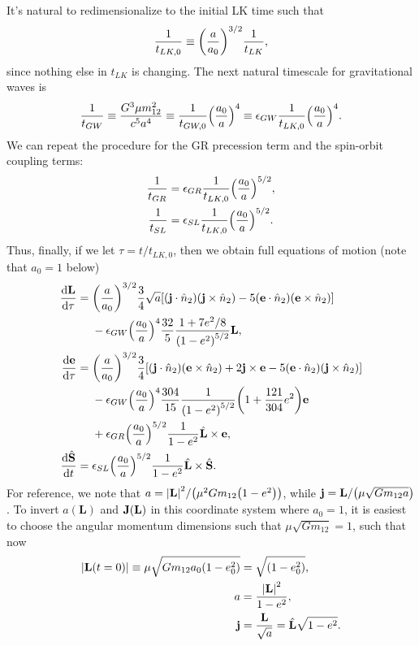 \documentclass[11pt,
        usenames, %
        dvipsnames %
    ]{article}
\newcommand*{\rd}[2]{\frac{\mathrm{d}#1}{\mathrm{d}#2}}
\newcommand*{\bm}[1]{\boldsymbol{\mathbf{#1}}}
\DeclarePairedDelimiter\abs{\lvert}{\rvert}
\DeclarePairedDelimiter\p{\lparen}{\rparen}
\DeclarePairedDelimiter\s{\lbrack}{\rbrack}
\begin{document}
It's natural to redimensionalize to the initial LK time such that
\begin{equation}
    \frac{1}{t_{LK, 0}} \equiv \p*{\frac{a}{a_0}}^{3/2}\frac{1}{t_{LK}},
\end{equation}
since nothing else in $t_{LK}$ is changing. The next natural timescale for
gravitational waves is
\begin{equation}
    \frac{1}{t_{GW}} \equiv \frac{G^3 \mu m_{12}^2}{c^5a^4}
        \equiv \frac{1}{t_{GW, 0}} \p*{\frac{a_0}{a}}^4
        \equiv \epsilon_{GW} \frac{1}{t_{LK, 0}} \p*{\frac{a_0}{a}}^4.
\end{equation}
We can repeat the procedure for the GR precession term and the spin-orbit
coupling terms:
\begin{align}
    \frac{1}{t_{GR}} &= \epsilon_{GR}\frac{1}{t_{LK, 0}}
        \p*{\frac{a_0}{a}}^{5/2},\\
    \frac{1}{t_{SL}} &= \epsilon_{SL}\frac{1}{t_{LK, 0}}
        \p*{\frac{a_0}{a}}^{5/2}.
\end{align}
Thus, finally, if we let $\tau = t / t_{LK, 0}$, then we obtain full equations
of motion (note that $a_0 = 1$ below)
\begin{align}
    \rd{\bm{L}}{\tau} ={}& \p*{\frac{a}{a_0}}^{3/2} \frac{3}{4}\sqrt{a}\s*{
            \p*{\bm{j} \cdot \hat{n}_2} \p*{\bm{j} \times \hat{n}_2}
            - 5\p*{\bm{e} \cdot \hat{n}_2}\p*{\bm{e} \times \hat{n}_2}
            }\nonumber\\
        &- \epsilon_{GW}\p*{\frac{a_0}{a}}^4
            \frac{32}{5} \frac{1 + 7e^2/8}{\p*{1 - e^2}^{5/2}}\bm{L},\\
    \rd{\bm{e}}{\tau} ={}& \p*{\frac{a}{a_0}}^{3/2} \frac{3}{4}\s*{
            \p*{\bm{j} \cdot \hat{n}_2} \p*{\bm{e} \times \hat{n}_2}
            + 2\bm{j} \times \bm{e}
            - 5\p*{\bm{e} \cdot \hat{n}_2}\p*{\bm{j} \times \hat{n}_2}
            }\nonumber\\
        &-\epsilon_{GW}\p*{\frac{a_0}{a}}^4
            \frac{304}{15} \frac{1}{\p*{1 - e^2}^{5/2}}\p*{1 + \frac{121}{304}
                e^2}\bm{e}\nonumber\\
        &+ \epsilon_{GR}\p*{\frac{a_0}{a}}^{5/2}\frac{1}{1 - e^2}
            \hat{\bm{L}} \times \bm{e},\\
    \rd{\hat{\bm{S}}}{t} ={}&
        \epsilon_{SL}\p*{\frac{a_0}{a}}^{5/2}\frac{1}{1 - e^2}
        \hat{\bm{L}} \times \hat{\bm{S}}.
\end{align}
For reference, we note that $a = \abs*{\bm{L}}^2 / \p*{\mu^2 Gm_{12}\p*{1 -
e^2}}$, while $\bm{j} = \bm{L} / \p*{\mu\sqrt{Gm_{12}a}}$. To invert $a(\bm{L})$
and $\bm{J}\p*{\bm{L}}$ in this coordinate system where $a_0 = 1$, it is easiest
to choose the angular momentum dimensions such that $\mu \sqrt{Gm_{12}} = 1$,
such that now
\begin{align}
    \abs*{\bm{L}\p*{t = 0}} \equiv \mu \sqrt{Gm_{12}a_0\p*{1 - e_0^2}}
        &= \sqrt{\p*{1 - e_0^2}},\\
    a &= \frac{\abs*{\bm{L}}^2}{1 - e^2},\\
    \bm{j} &= \frac{\bm{L}}{\sqrt{a}} = \hat{\bm{L}}\sqrt{1 - e^2}.
\end{align}
\end{document}
